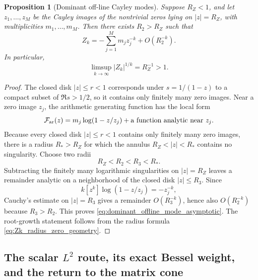 \documentclass[11pt]{amsart}
\numberwithin{equation}{section}
\theoremstyle{plain}
\newtheorem{proposition}[theorem]{Proposition}
\theoremstyle{definition}
\theoremstyle{remark}
\begin{document}
\begin{proposition}[Dominant off-line Cayley modes]
\label{prop:dominant_offline_modes}
Suppose $R_Z<1$, and let $z_1,\dots,z_M$ be the Cayley images of the nontrivial zeros lying on $|z|=R_Z$, with multiplicities $m_1,\dots,m_M$.  Then there exists $R_2>R_Z$ such that
\begin{equation}
 Z_k
 =-\sum_{j=1}^{M}m_jz_j^{-k}
 +O(R_2^{-k}).
 \label{eq:dominant_offline_mode_asymptotic}
\end{equation}
In particular,
\begin{equation}
 \limsup_{k\to\infty}|Z_k|^{1/k}=R_Z^{-1}>1.
 \label{eq:dominant_offline_root_growth}
\end{equation}
\end{proposition}

\begin{proof}
The closed disk $|z|\le r<1$ corresponds under $s=1/(1-z)$ to a compact subset of $\Re s>1/2$, so it contains only finitely many zero images.  Near a zero image $z_j$, the arithmetic generating function has the local form
\begin{equation}
 \mathcal F_{\rm ar}(z)
 =m_j\log(1-z/z_j)+\text{a function analytic near }z_j.
\end{equation}
Because every closed disk $|z|\le r<1$ contains only finitely many zero images, there is a radius
$R_*>R_Z$ for which the annulus $R_Z<|z|<R_*$ contains no singularity.  Choose two radii
\begin{equation}
R_Z<R_2<R_3<R_*.
\end{equation}
Subtracting the finitely many logarithmic singularities on $|z|=R_Z$ leaves a remainder analytic
on a neighborhood of the closed disk $|z|\le R_3$.  Since
\begin{equation}
 k[z^k]\log(1-z/z_j)=-z_j^{-k},
\end{equation}
Cauchy's estimate on $|z|=R_3$ gives a remainder $O(R_3^{-k})$, hence also $O(R_2^{-k})$ because
$R_3>R_2$.  This proves \eqref{eq:dominant_offline_mode_asymptotic}.  The root-growth statement
follows from the radius formula \eqref{eq:Zk_radius_zero_geometry}.
\end{proof}


\subsection{\texorpdfstring{The scalar $L^2$ route, its exact Bessel weight, and the return to the matrix cone}{The scalar L2 route, its exact Bessel weight, and the return to the matrix cone}}
\label{subsec:scalar_L2_barrier_matrix_return}
\end{document}
